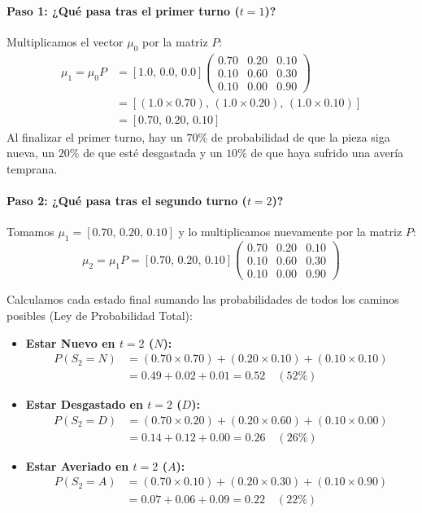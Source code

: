 \paragraph{Paso 1: ¿Qué pasa tras el primer turno ($t=1$)?}
Multiplicamos el vector $\mu_0$ por la matriz $P$:
\begin{align*}
  \mu_1 = \mu_0 P &= [1.0, \, 0.0, \, 0.0] \begin{pmatrix}
    0.70 & 0.20 & 0.10 \\
    0.10 & 0.60 & 0.30 \\
    0.10 & 0.00 & 0.90
  \end{pmatrix} \\
  &= [ (1.0 \times 0.70), \, (1.0 \times 0.20), \, (1.0 \times 0.10) ] \\
  &= \mathbf{[0.70, \, 0.20, \, 0.10]}
\end{align*}
Al finalizar el primer turno, hay un $70\%$ de probabilidad de que la pieza siga nueva, un $20\%$ de que esté desgastada y un $10\%$ de que haya sufrido una avería temprana.

\paragraph{Paso 2: ¿Qué pasa tras el segundo turno ($t=2$)?}
Tomamos $\mu_1 = [0.70, \, 0.20, \, 0.10]$ y lo multiplicamos nuevamente por la matriz $P$:
\begin{equation*}
  \mu_2 = \mu_1 P = [0.70, \, 0.20, \, 0.10] \begin{pmatrix}
    0.70 & 0.20 & 0.10 \\
    0.10 & 0.60 & 0.30 \\
    0.10 & 0.00 & 0.90
  \end{pmatrix}
\end{equation*}

Calculamos cada estado final sumando las probabilidades de todos los caminos posibles (Ley de Probabilidad Total):
\begin{itemize}
  \item \textbf{Estar Nuevo en $t=2$ ($N$):}
  \begin{align*}
    P(S_2 = N) &= (0.70 \times 0.70) + (0.20 \times 0.10) + (0.10 \times 0.10) \\
    &= 0.49 + 0.02 + 0.01 = \mathbf{0.52} \quad (52\%)
  \end{align*}
  \item \textbf{Estar Desgastado en $t=2$ ($D$):}
  \begin{align*}
    P(S_2 = D) &= (0.70 \times 0.20) + (0.20 \times 0.60) + (0.10 \times 0.00) \\
    &= 0.14 + 0.12 + 0.00 = \mathbf{0.26} \quad (26\%)
  \end{align*}
  \item \textbf{Estar Averiado en $t=2$ ($A$):}
  \begin{align*}
    P(S_2 = A) &= (0.70 \times 0.10) + (0.20 \times 0.30) + (0.10 \times 0.90) \\
    &= 0.07 + 0.06 + 0.09 = \mathbf{0.22} \quad (22\%)
  \end{align*}
\end{itemize}

